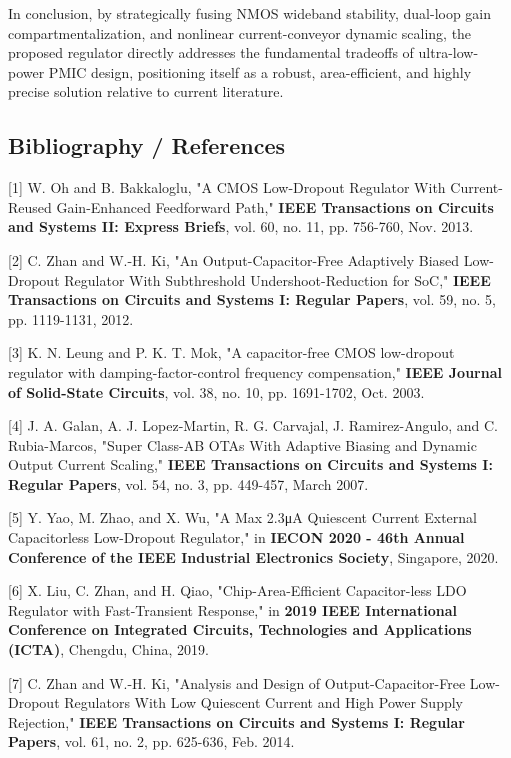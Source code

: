 \documentclass[
]{article}
\begin{document}
In conclusion, by strategically fusing NMOS wideband stability,
dual-loop gain compartmentalization, and nonlinear current-conveyor
dynamic scaling, the proposed regulator directly addresses the
fundamental tradeoffs of ultra-low-power PMIC design, positioning itself
as a robust, area-efficient, and highly precise solution relative to
current literature.

\subsection{Bibliography / References}\label{_bibliography_references}

{[}1{]} W. Oh and B. Bakkaloglu, "A CMOS Low-Dropout Regulator With
Current-Reused Gain-Enhanced Feedforward Path," \textbf{IEEE
Transactions on Circuits and Systems II: Express Briefs}, vol. 60, no.
11, pp. 756-760, Nov. 2013.

{[}2{]} C. Zhan and W.-H. Ki, "An Output-Capacitor-Free Adaptively
Biased Low-Dropout Regulator With Subthreshold Undershoot-Reduction for
SoC," \textbf{IEEE Transactions on Circuits and Systems I: Regular
Papers}, vol. 59, no. 5, pp. 1119-1131, 2012.

{[}3{]} K. N. Leung and P. K. T. Mok, "A capacitor-free CMOS low-dropout
regulator with damping-factor-control frequency compensation,"
\textbf{IEEE Journal of Solid-State Circuits}, vol. 38, no. 10, pp.
1691-1702, Oct. 2003.

{[}4{]} J. A. Galan, A. J. Lopez-Martin, R. G. Carvajal, J.
Ramirez-Angulo, and C. Rubia-Marcos, "Super Class-AB OTAs With Adaptive
Biasing and Dynamic Output Current Scaling," \textbf{IEEE Transactions
on Circuits and Systems I: Regular Papers}, vol. 54, no. 3, pp. 449-457,
March 2007.

{[}5{]} Y. Yao, M. Zhao, and X. Wu, "A Max 2.3μA Quiescent Current
External Capacitorless Low-Dropout Regulator," in \textbf{IECON 2020 -
46th Annual Conference of the IEEE Industrial Electronics Society},
Singapore, 2020.

{[}6{]} X. Liu, C. Zhan, and H. Qiao, "Chip-Area-Efficient
Capacitor-less LDO Regulator with Fast-Transient Response," in
\textbf{2019 IEEE International Conference on Integrated Circuits,
Technologies and Applications (ICTA)}, Chengdu, China, 2019.

{[}7{]} C. Zhan and W.-H. Ki, "Analysis and Design of
Output-Capacitor-Free Low-Dropout Regulators With Low Quiescent Current
and High Power Supply Rejection," \textbf{IEEE Transactions on Circuits
and Systems I: Regular Papers}, vol. 61, no. 2, pp. 625-636, Feb. 2014.
\end{document}
